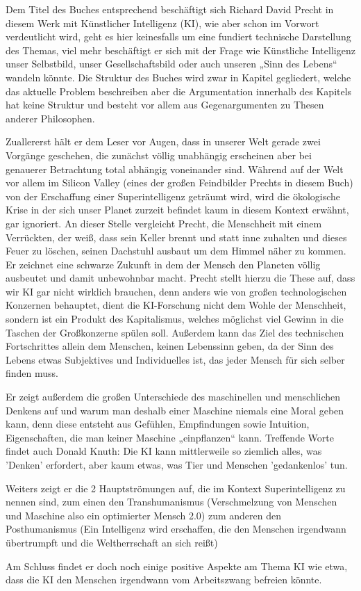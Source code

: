 \documentclass[twoside, a4paper, DIV=11, open=any, bibliography=totoc]{scrbook}
\newcommand{\Quote}[1]{\glqq #1\grqq{}}
\begin{document}
Dem Titel des Buches entsprechend beschäftigt sich Richard David Precht in diesem Werk mit Künstlicher Intelligenz (KI), wie aber schon im Vorwort verdeutlicht wird, geht es hier keinesfalls um eine fundiert technische Darstellung des Themas, viel mehr beschäftigt er sich mit der Frage wie Künstliche Intelligenz unser Selbstbild, unser Gesellschaftsbild oder auch unseren „Sinn des Lebens“ wandeln könnte. Die Struktur des Buches wird zwar in Kapitel gegliedert, welche das aktuelle Problem beschreiben aber die Argumentation innerhalb des Kapitels hat keine Struktur und besteht vor allem aus Gegenargumenten zu Thesen anderer Philosophen. \par 
Zuallererst hält er dem Leser vor Augen, dass in unserer Welt gerade zwei Vorgänge geschehen, die zunächst völlig unabhängig erscheinen aber bei genauerer Betrachtung total abhängig voneinander sind. Während auf der Welt vor allem im Silicon Valley (eines der großen Feindbilder Prechts in diesem Buch) von der Erschaffung einer Superintelligenz geträumt wird, wird die ökologische Krise in der sich unser Planet zurzeit befindet kaum in diesem Kontext erwähnt, gar ignoriert. An dieser Stelle vergleicht Precht, die Menschheit mit einem Verrückten, der weiß, dass sein Keller brennt und statt inne zuhalten und dieses Feuer zu löschen, seinen Dachstuhl ausbaut um dem Himmel näher zu kommen. Er zeichnet eine schwarze Zukunft in dem der Mensch den Planeten völlig ausbeutet und damit unbewohnbar macht. Precht stellt hierzu die These auf, dass wir KI gar nicht wirklich brauchen, denn anders wie von großen technologischen Konzernen behauptet, dient die KI-Forschung nicht dem Wohle der Menschheit, sondern ist ein Produkt des Kapitalismus, welches möglichst viel Gewinn in die Taschen der Großkonzerne spülen soll. Außerdem kann das Ziel des technischen Fortschrittes allein dem Menschen, keinen Lebenssinn geben, da der Sinn des Lebens etwas Subjektives und Individuelles ist, das jeder Mensch für sich selber finden muss. \par
Er zeigt außerdem die großen Unterschiede des maschinellen und menschlichen Denkens auf und warum man deshalb einer Maschine niemals eine Moral geben kann, denn diese entsteht aus Gefühlen, Empfindungen sowie Intuition, Eigenschaften, die man keiner Maschine „einpflanzen“ kann. Treffende Worte findet auch Donald Knuth: \Quote{Die KI kann mittlerweile so ziemlich alles, was 'Denken' erfordert, aber kaum etwas, was Tier und Menschen 'gedankenlos' tun}. \par
Weiters zeigt er die 2 Hauptströmungen auf, die im Kontext Superintelligenz zu nennen sind, zum einen den Transhumanismus (Verschmelzung von Menschen und Maschine also ein optimierter Mensch 2.0) zum anderen den Posthumanismus (Ein Intelligenz wird erschaffen, die den Menschen irgendwann übertrumpft und die Weltherrschaft an sich reißt) \par
Am Schluss findet er doch noch einige positive Aspekte am Thema KI wie etwa, dass die KI den Menschen irgendwann vom Arbeitszwang befreien könnte.
\end{document}
